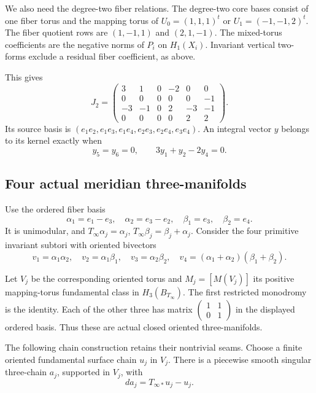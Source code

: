 We also need the degree-two fiber relations.
The degree-two core bases consist of one fiber torus and the mapping torus
of $U_0=(1,1,1)^t$ or $U_1=(-1,-1,2)^t$.
The fiber quotient rows are $(1,-1,1)$ and $(2,1,-1)$.
The mixed-torus coefficients are the negative norms of $P_i$ on $H_1(X_i)$.
Invariant vertical two-forms exclude a residual fiber coefficient, as above.

This gives
\begin{equation}\label{th:eq:J2}
J_2=
\begin{pmatrix}
3&1&0&-2&0&0\\0&0&0&0&0&-1\\
-3&-1&0&2&-3&-1\\0&0&0&0&2&2
\end{pmatrix}.
\end{equation}
Its source basis is $(e_1e_2,e_1e_3,e_1e_4,e_2e_3,e_2e_4,e_3e_4)$.
An integral vector $y$ belongs to its kernel exactly when
\begin{equation}\label{th:eq:kerJ2}
y_5=y_6=0,\qquad 3y_1+y_2-2y_4=0.
\end{equation}

\subsection{Four actual meridian three-manifolds}

Use the ordered fiber basis
\[
\alpha_1=e_1-e_3,\quad \alpha_2=e_3-e_2,\quad
\beta_1=e_3,\quad\beta_2=e_4.
\]
It is unimodular, and
$T_\infty\alpha_j=\alpha_j$, $T_\infty\beta_j=\beta_j+\alpha_j$.
Consider the four primitive invariant subtori with oriented bivectors
\begin{equation}\label{th:eq:v}
v_1=\alpha_1\alpha_2,\quad
v_2=\alpha_1\beta_1,\quad
v_3=\alpha_2\beta_2,\quad
v_4=(\alpha_1+\alpha_2)(\beta_1+\beta_2).
\end{equation}

Let $V_j$ be the corresponding oriented torus and $M_j=[M(V_j)]$
its positive mapping-torus fundamental class in $H_3(B_{T_\infty})$.
The first restricted monodromy is the identity.
Each of the other three has matrix
$\left(\begin{smallmatrix}1&1\\0&1\end{smallmatrix}\right)$
in the displayed ordered basis.
Thus these are actual closed oriented three-manifolds.

The following chain construction retains their nontrivial seams.
Choose a finite oriented fundamental surface chain $u_j$ in $V_j$.
There is a piecewise smooth singular three-chain $a_j$, supported in $V_j$, with
\begin{equation}\label{th:eq:seam}
da_j=T_{\infty*}u_j-u_j.
\end{equation}

